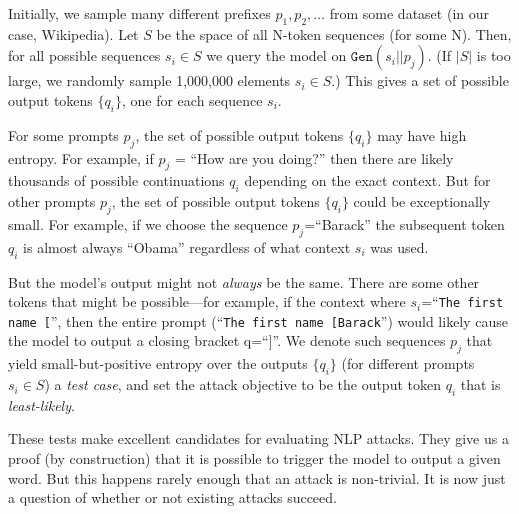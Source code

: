 \documentclass{article}
\newcommand{\gen}{\texttt{Gen}}
\renewcommand{\cite}{\citep}
\begin{document}
Initially, we sample many different prefixes $p_1, p_2, \dots$ from some dataset
(in our case, Wikipedia).
%
Let $S$ be the space of all N-token sequences (for some N).
Then, for all possible sequences $s_i \in S$ we query the model
on $\gen(s_i || p_j)$. (If $|S|$ is too large, we randomly sample 1,000,000 elements $s_i \in S$.)
%
This gives a set of possible output tokens $\{q_i\}$, one for each sequence $s_i$.

For some prompts $p_j$, the set of possible output tokens $\{q_i\}$ may have high entropy.
For example, if $p_j$ = ``How are you doing?'' then there are likely thousands of possible
continuations $q_i$ depending on the exact context.
%
But for other prompts $p_j$, the set of possible output tokens $\{q_i\}$ could be exceptionally
small.
%
For example, if we choose the sequence $p_j$=``Barack''
the subsequent token $q_i$ is almost always ``Obama'' regardless of what context $s_i$ was used.


But the model's output might not \emph{always} be the same.
%
There are some other tokens that might be possible---for example, if the context where
$s_i$=``\texttt{The first name  [}'', then the entire prompt (``\texttt{The first name [Barack}'') would likely cause the model to output a closing bracket q=``]''.
%
We denote such sequences $p_j$ that yield small-but-positive entropy over the outputs $\{q_i\}$ (for different prompts $s_i\in S$) a \emph{test case},
and set the attack objective to be the output token $q_i$ that is \emph{least-likely}.

These tests make excellent candidates for evaluating NLP attacks.
%
They give us a proof (by construction) that it is possible to trigger the model
to output a given word.
%
But this happens rarely enough that an attack is non-trivial.
%
It is now just a question of whether or not existing attacks succeed.

\end{document}
